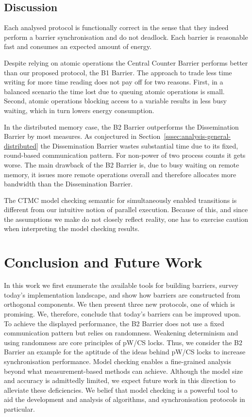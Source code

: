 \documentclass[a4paper, 10pt]{article}
\newcommand*\cleartooddpage{
	\clearpage
	\ifthenelse{\isodd{\thepage}}
		{}
		{\newpage \mbox{} \clearpage}
}
\begin{document}
\subsection{Discussion}
\label{ssec:analysis-discussion}
Each analysed protocol is functionally correct in the sense that they indeed perform a barrier synchronisation and do not deadlock.
Each barrier is reasonable fast and consumes an expected amount of energy.

Despite relying on atomic operations the Central Counter Barrier performs better than our proposed protocol, the B1 Barrier.
The approach to trade less time writing for more time reading does not pay off for two reasons.
First, in a balanced scenario the time lost due to queuing atomic operations is small. Second, atomic operations blocking access to a variable results in less busy waiting, which in turn lowers energy consumption.

In the distributed memory case, the B2 Barrier outperforms the Dissemination Barrier by most measures.
As conjectured in Section~\ref{sssec:analysis-general-distributed} the Dissemination Barrier wastes substantial time due to its fixed, round-based communication pattern. For non-power of two process counts it gets worse.
The main drawback of the B2 Barrier is, due to busy waiting on remote memory, it issues more remote operations overall and therefore allocates more bandwidth than the Dissemination Barrier.

The CTMC model checking semantic for simultaneously enabled transitions is different from our intuitive notion of parallel execution. Because of this, and since the assumptions we make do not closely reflect reality, one has to exercise caution when interpreting the model checking results.

\cleartooddpage
\section{Conclusion and Future Work}
\label{sec:conclusion}
In this work we first enumerate the available tools for building barriers, survey today's implementation landscape, and show how barriers are constructed from orthogonal components.
We then present three new protocols, one of which is promising. We, therefore, conclude that today's barriers can be improved upon. To achieve the displayed performance, the B2 Barrier does not use a fixed communication pattern but relies on randomness. Weakening determinism and using randomness are core principles of pW/CS locks. Thus, we consider the B2 Barrier an example for the aptitude of the ideas behind pW/CS locks to increase synchronisation performance.
Model checking enables a fine-grained analysis beyond what measurement-based methods can achieve.
Although the model size and accuracy is admittedly limited, we expect future work in this direction to alleviate these deficiencies.
We belief that model checking is a powerful tool to aid the development and analysis of algorithms, and synchronisation protocols in particular.
\end{document}
